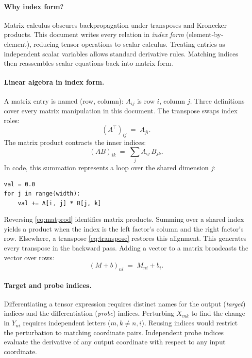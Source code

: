 \documentclass[letterpaper, 10 pt, conference]{ieeeconf}
\theoremstyle{definition}
\begin{document}
\paragraph{Why index form?}
Matrix calculus obscures backpropagation under transposes and Kronecker products. This document writes every relation in \emph{index form} (element-by-element), reducing tensor operations to scalar calculus. Treating entries as independent scalar variables allows standard derivative rules. Matching indices then reassembles scalar equations back into matrix form.

\paragraph{Linear algebra in index form.}
A matrix entry is named (row, column): $A_{ij}$ is row $i$, column $j$. Three definitions cover every matrix manipulation in this document. The transpose swaps index roles:
\begin{equation}
  (A^{\top})_{ij} \;=\; A_{ji}.
  \label{eq:transpose}
\end{equation}
The matrix product contracts the inner indices:
\begin{equation}
  (AB)_{ik} \;=\; \sum_j A_{ij}\,B_{jk}.
  \label{eq:matprod}
\end{equation}
In code, this summation represents a loop over the shared dimension $j$:
\begin{verbatim}
val = 0.0
for j in range(width):
    val += A[i, j] * B[j, k]
\end{verbatim}
Reversing \eqref{eq:matprod} identifies matrix products. Summing over a shared index yields a product when the index is the left factor's column and the right factor's row. Elsewhere, a transpose \eqref{eq:transpose} restores this alignment. This generates every transpose in the backward pass.
Adding a vector to a matrix broadcasts the vector over rows:
\begin{equation}
  (M + b)_{ni} \;=\; M_{ni} + b_i.
  \label{eq:broadcast}
\end{equation}

\paragraph{Target and probe indices.}
Differentiating a tensor expression requires distinct names for the output (\emph{target}) indices and the differentiation (\emph{probe}) indices. Perturbing $X_{mk}$ to find the change in $Y_{ni}$ requires independent letters ($m, k \neq n, i$). Reusing indices would restrict the perturbation to matching coordinate pairs. Independent probe indices evaluate the derivative of any output coordinate with respect to any input coordinate.
\end{document}
